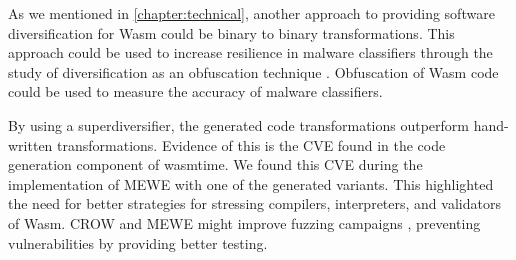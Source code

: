 As we mentioned in \autoref{chapter:technical}, another approach to providing software diversification for Wasm could be binary to binary transformations. 
This approach could be used to increase resilience in malware classifiers through the study of diversification as an obfuscation technique \cite{10.1145/3507657.3528560}.
Obfuscation of Wasm code could be used to measure the accuracy of malware classifiers.



By using a superdiversifier, the generated code transformations outperform hand-written transformations. Evidence of this is the CVE\cite{CVE} found in the code generation component of wasmtime. 
We found this CVE during the implementation of MEWE with one of the generated variants.
This highlighted the need for better strategies for stressing compilers, interpreters, and validators of Wasm.
CROW and MEWE might improve fuzzing campaigns \cite{zalewski2017american}, preventing vulnerabilities by providing better testing.